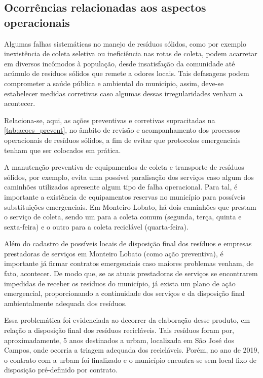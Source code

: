 	\subsection{Ocorrências relacionadas aos aspectos operacionais}
	Algumas falhas sistemáticas no manejo de resíduos sólidos, como por exemplo inexistência de coleta seletiva ou ineficiência nas rotas de coleta, podem acarretar em diversos incômodos à população, desde insatisfação da comunidade até acúmulo de resíduos sólidos que remete a odores locais. Tais defasagens podem comprometer a saúde pública e ambiental do município, assim, deve-se estabelecer medidas corretivas caso algumas dessas irregularidades venham a acontecer. 

	Relaciona-se, aqui, as ações preventivas e corretivas supracitadas na \autoref{tab:acoes_prevent}, no âmbito de revisão e acompanhamento dos processos operacionais de resíduos sólidos, a fim de evitar que protocolos emergenciais tenham que ser colocados em prática. 

	A manutenção preventiva de equipamentos de coleta e transporte de resíduos sólidos, por exemplo, evita uma possível paralisação dos serviços caso algum dos caminhões utilizados apresente algum tipo de falha operacional. Para tal, é importante a existência de equipamentos reservas no município para possíveis substituições emergenciais. Em Monteiro Lobato, há dois caminhões que prestam o serviço de coleta, sendo um para a coleta comum (segunda, terça, quinta e sexta-feira) e o outro para a coleta reciclável (quarta-feira).
 
	Além do cadastro de possíveis locais de disposição final dos resíduos e empresas prestadoras de serviços em Monteiro Lobato (como ação preventiva), é importante já firmar contratos emergenciais caso maiores problemas venham, de fato, acontecer. De modo que, se as atuais prestadoras de serviços se encontrarem impedidas de receber os resíduos do município, já exista um plano de ação emergencial, proporcionando a continuidade dos serviços e da disposição final ambientalmente adequada dos resíduos.

	Essa problemática foi evidenciada ao decorrer da elaboração desse produto, em relação a disposição final dos resíduos recicláveis. Tais resíduos foram por, aproximadamente, 5 anos destinados a \gls{urbam}, localizada em São José dos Campos, onde ocorria a triagem adequada dos recicláveis. Porém, no ano de 2019, o contrato com a \gls{urbam} foi finalizado e o município encontra-se sem local fixo de disposição pré-definido por contrato.


